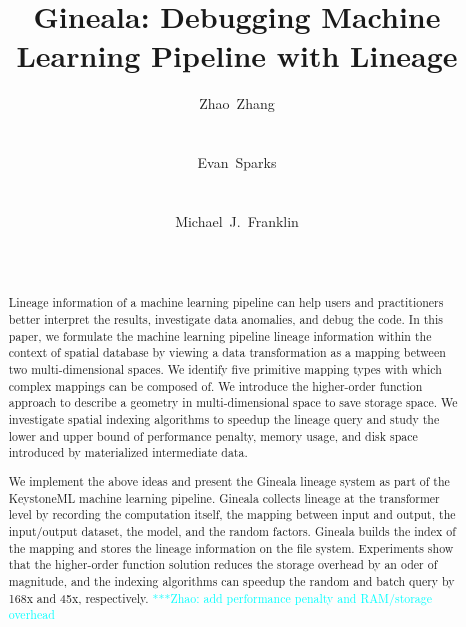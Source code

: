 \documentclass{sig-alternate}
\newcommand{\zhaonote}[1]{{\textcolor{cyan}    { ***Zhao:      #1 }}}
\newcommand{\zhaonote}[1]{}
\begin{document}
\title{Gineala: Debugging Machine Learning Pipeline with Lineage}

\author{
\alignauthor Zhao~Zhang\\\
       \\
        \\
\alignauthor Evan~Sparks\\\
       \\
       \\
\alignauthor Michael~J.~Franklin\\
       \\
       \\
}

\maketitle

\begin{abstract}
Lineage information of a machine learning pipeline can help users and practitioners 
better interpret the results, investigate data anomalies, and debug the code.
In this paper, we formulate the machine learning pipeline lineage information within the context of spatial database
by viewing a data transformation as a mapping between two multi-dimensional spaces.
We identify five primitive mapping types with which complex mappings can be composed of. 
We introduce the higher-order function approach to describe a geometry in multi-dimensional space to save storage space.
We investigate spatial indexing algorithms to speedup the lineage query and study the
lower and upper bound of performance penalty, memory usage, and disk space introduced by materialized intermediate data.

We implement the above ideas and present the Gineala lineage system as part of the KeystoneML machine learning pipeline.
Gineala collects lineage at the transformer level by recording the computation itself, the mapping
between input and output,  the input/output dataset, the model, and the random factors. 
Gineala builds the index of the mapping and stores the lineage information on the file system. 
Experiments show that the higher-order function solution reduces the storage overhead by an oder of magnitude, 
and the indexing algorithms can speedup the random and batch query by 168x and 45x, respectively.
\zhaonote{add performance penalty and RAM/storage overhead}

\end{abstract}
\end{document}
